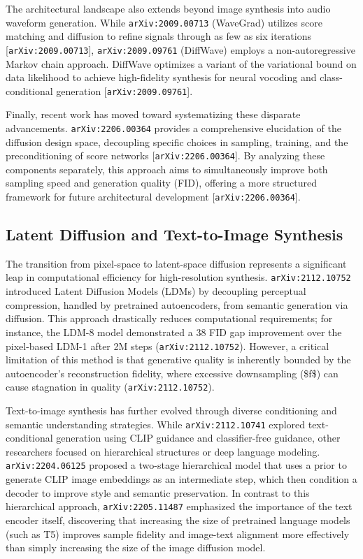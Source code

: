 \documentclass[11pt]{article}
\begin{document}
The architectural landscape also extends beyond image synthesis into audio waveform generation. While \texttt{arXiv:2009.00713} (WaveGrad) utilizes score matching and diffusion to refine signals through as few as six iterations [\texttt{arXiv:2009.00713}], \texttt{arXiv:2009.09761} (DiffWave) employs a non-autoregressive Markov chain approach. DiffWave optimizes a variant of the variational bound on data likelihood to achieve high-fidelity synthesis for neural vocoding and class-conditional generation [\texttt{arXiv:2009.09761}].

Finally, recent work has moved toward systematizing these disparate advancements. \texttt{arXiv:2206.00364} provides a comprehensive elucidation of the diffusion design space, decoupling specific choices in sampling, training, and the preconditioning of score networks [\texttt{arXiv:2206.00364}]. By analyzing these components separately, this approach aims to simultaneously improve both sampling speed and generation quality (FID), offering a more structured framework for future architectural development [\texttt{arXiv:2206.00364}].

\subsection{Latent Diffusion and Text-to-Image Synthesis}

The transition from pixel-space to latent-space diffusion represents a significant leap in computational efficiency for high-resolution synthesis. \texttt{arXiv:2112.10752} introduced Latent Diffusion Models (LDMs) by decoupling perceptual compression, handled by pretrained autoencoders, from semantic generation via diffusion. This approach drastically reduces computational requirements; for instance, the LDM-8 model demonstrated a 38 FID gap improvement over the pixel-based LDM-1 after 2M steps (\texttt{arXiv:2112.10752}). However, a critical limitation of this method is that generative quality is inherently bounded by the autoencoder's reconstruction fidelity, where excessive downsampling (\$f\$) can cause stagnation in quality (\texttt{arXiv:2112.10752}).

Text-to-image synthesis has further evolved through diverse conditioning and semantic understanding strategies. While \texttt{arXiv:2112.10741} explored text-conditional generation using CLIP guidance and classifier-free guidance, other researchers focused on hierarchical structures or deep language modeling. \texttt{arXiv:2204.06125} proposed a two-stage hierarchical model that uses a prior to generate CLIP image embeddings as an intermediate step, which then condition a decoder to improve style and semantic preservation. In contrast to this hierarchical approach, \texttt{arXiv:2205.11487} emphasized the importance of the text encoder itself, discovering that increasing the size of pretrained language models (such as T5) improves sample fidelity and image-text alignment more effectively than simply increasing the size of the image diffusion model.
\end{document}
